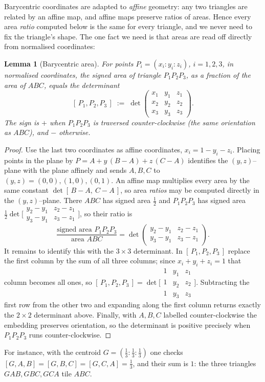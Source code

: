 \documentclass[11pt,a4paper,reqno]{amsart}
\newtheorem{lemma}[theorem]{Lemma}
\theoremstyle{definition}
\theoremstyle{remark}
\begin{document}
Barycentric coordinates are adapted to \emph{affine} geometry: any two triangles are related by an affine map,
and affine maps preserve ratios of areas. Hence every area \emph{ratio} computed below is the same for every
triangle, and we never need to fix the triangle's shape. The one fact we need is that areas are read off directly
from normalised coordinates:
\begin{lemma}[Barycentric area]\label{lem:area}
For points $P_i=(x_i:y_i:z_i)$, $i=1,2,3$, in normalised coordinates, the signed area of triangle $P_1P_2P_3$,
as a fraction of the area of $ABC$, equals the determinant
\[
[\,P_1,P_2,P_3\,]\;:=\;
\det\!\begin{pmatrix} x_1&y_1&z_1\\ x_2&y_2&z_2\\ x_3&y_3&z_3\end{pmatrix}.
\]
The sign is $+$ when $P_1P_2P_3$ is traversed counter-clockwise (the same orientation as $ABC$), and $-$
otherwise.
\end{lemma}
\begin{proof}
Use the last two coordinates as affine coordinates, $x_i=1-y_i-z_i$. Placing points in the plane by
$P=A+y\,(B-A)+z\,(C-A)$ identifies the $(y,z)$--plane with the plane affinely and sends $A,B,C$ to
$(y,z)=(0,0),(1,0),(0,1)$. An affine map multiplies every area by the same constant $\det[\,B-A,\ C-A\,]$, so
area \emph{ratios} may be computed directly in the $(y,z)$--plane. There $ABC$ has signed area $\tfrac12$ and
$P_1P_2P_3$ has signed area $\tfrac12\det\!\big[\begin{smallmatrix} y_2-y_1 & z_2-z_1\\ y_3-y_1 &
z_3-z_1\end{smallmatrix}\big]$, so their ratio is
\[
\frac{\text{signed area }P_1P_2P_3}{\text{area }ABC}
=\det\!\begin{pmatrix} y_2-y_1 & z_2-z_1\\ y_3-y_1 & z_3-z_1\end{pmatrix}.
\]
It remains to identify this with the $3\times3$ determinant. In $[\,P_1,P_2,P_3\,]$ replace the first column by
the sum of all three columns; since $x_i+y_i+z_i=1$ that column becomes all ones, so
$[\,P_1,P_2,P_3\,]=\det\!\big[\begin{smallmatrix} 1&y_1&z_1\\ 1&y_2&z_2\\ 1&y_3&z_3\end{smallmatrix}\big]$.
Subtracting the first row from the other two and expanding along the first column returns exactly the $2\times2$
determinant above. Finally, with $A,B,C$ labelled counter-clockwise the embedding preserves orientation, so the
determinant is positive precisely when $P_1P_2P_3$ runs counter-clockwise.
\end{proof}
For instance, with the centroid $G=(\tfrac13:\tfrac13:\tfrac13)$ one checks $[G,A,B]=[G,B,C]=[G,C,A]=\tfrac13$,
and their sum is $1$: the three triangles $GAB,GBC,GCA$ tile $ABC$.
\end{document}
